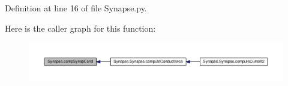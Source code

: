 Definition at line 16 of file Synapse.\-py.



Here is the caller graph for this function\-:\nopagebreak
\begin{figure}[H]
\begin{center}
\leavevmode
\includegraphics[width=350pt]{namespace_synapse_a55ffd471fbed3550b464a9862687f541_icgraph}
\end{center}
\end{figure}


